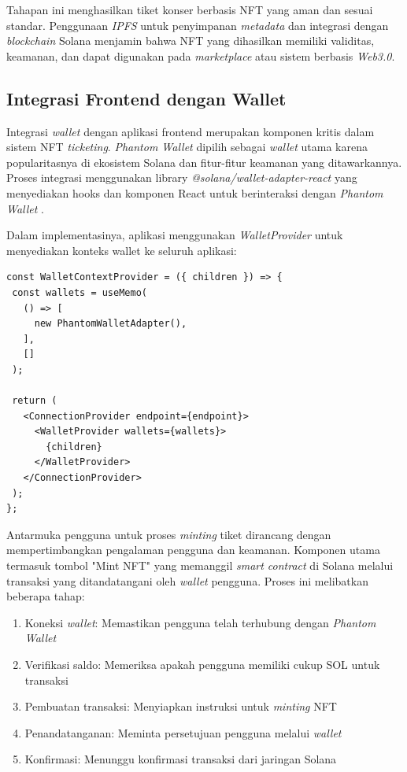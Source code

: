 Tahapan ini menghasilkan tiket konser berbasis NFT yang aman dan sesuai standar. Penggunaan \textit{IPFS} untuk penyimpanan \textit{metadata} dan integrasi dengan \textit{blockchain} Solana menjamin bahwa NFT yang dihasilkan memiliki validitas, keamanan, dan dapat digunakan pada \textit{marketplace} atau sistem berbasis \textit{Web3.0}.



\subsection{Integrasi Frontend dengan Wallet}
Integrasi \textit{wallet} dengan aplikasi frontend merupakan komponen kritis dalam sistem NFT \textit{ticketing}. \textit{Phantom Wallet} dipilih sebagai \textit{wallet} utama karena popularitasnya di ekosistem Solana dan fitur-fitur keamanan yang ditawarkannya. Proses integrasi menggunakan library \textit{@solana/wallet-adapter-react} yang menyediakan hooks dan komponen React untuk berinteraksi dengan \textit{Phantom Wallet} \parencite{ref5}.

Dalam implementasinya, aplikasi menggunakan \textit{WalletProvider} untuk menyediakan konteks wallet ke seluruh aplikasi:

\begin{verbatim}
const WalletContextProvider = ({ children }) => {
 const wallets = useMemo(
   () => [
     new PhantomWalletAdapter(),
   ],
   []
 );

 return (
   <ConnectionProvider endpoint={endpoint}>
     <WalletProvider wallets={wallets}>
       {children}
     </WalletProvider>
   </ConnectionProvider>
 );
};
\end{verbatim}

Antarmuka pengguna untuk proses \textit{minting} tiket dirancang dengan mempertimbangkan pengalaman pengguna dan keamanan. Komponen utama termasuk tombol "Mint NFT" yang memanggil \textit{smart contract} di Solana melalui transaksi yang ditandatangani oleh \textit{wallet} pengguna. Proses ini melibatkan beberapa tahap:

\begin{enumerate}
   \item Koneksi \textit{wallet}: Memastikan pengguna telah terhubung dengan \textit{Phantom Wallet}
   \item Verifikasi saldo: Memeriksa apakah pengguna memiliki cukup SOL untuk transaksi
   \item Pembuatan transaksi: Menyiapkan instruksi untuk \textit{minting} NFT
   \item Penandatanganan: Meminta persetujuan pengguna melalui \textit{wallet}
   \item Konfirmasi: Menunggu konfirmasi transaksi dari jaringan Solana
\end{enumerate}

